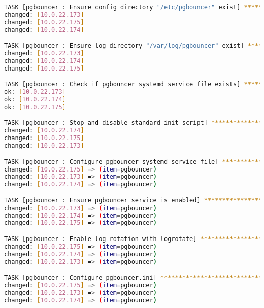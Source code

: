 \begin{flushleft}
\begin{lstlisting}[language=bash, caption=Deploy - Anhang - Deployt,captionpos=b,label={lst:deploy-appendix-deployt},breaklines=true]
TASK [pgbouncer : Ensure config directory "/etc/pgbouncer" exist] *************************************************************************************************************************************************
changed: [10.0.22.173]
changed: [10.0.22.175]
changed: [10.0.22.174]

TASK [pgbouncer : Ensure log directory "/var/log/pgbouncer" exist] ************************************************************************************************************************************************
changed: [10.0.22.173]
changed: [10.0.22.174]
changed: [10.0.22.175]

TASK [pgbouncer : Check if pgbouncer systemd service file exists] *************************************************************************************************************************************************
ok: [10.0.22.173]
ok: [10.0.22.174]
ok: [10.0.22.175]

TASK [pgbouncer : Stop and disable standard init script] **********************************************************************************************************************************************************
changed: [10.0.22.174]
changed: [10.0.22.175]
changed: [10.0.22.173]

TASK [pgbouncer : Configure pgbouncer systemd service file] *******************************************************************************************************************************************************
changed: [10.0.22.175] => (item=pgbouncer)
changed: [10.0.22.173] => (item=pgbouncer)
changed: [10.0.22.174] => (item=pgbouncer)

TASK [pgbouncer : Ensure pgbouncer service is enabled] ************************************************************************************************************************************************************
changed: [10.0.22.173] => (item=pgbouncer)
changed: [10.0.22.174] => (item=pgbouncer)
changed: [10.0.22.175] => (item=pgbouncer)

TASK [pgbouncer : Enable log rotation with logrotate] *************************************************************************************************************************************************************
changed: [10.0.22.175] => (item=pgbouncer)
changed: [10.0.22.174] => (item=pgbouncer)
changed: [10.0.22.173] => (item=pgbouncer)

TASK [pgbouncer : Configure pgbouncer.ini] ************************************************************************************************************************************************************************
changed: [10.0.22.175] => (item=pgbouncer)
changed: [10.0.22.173] => (item=pgbouncer)
changed: [10.0.22.174] => (item=pgbouncer)


\end{lstlisting}
\end{flushleft}
